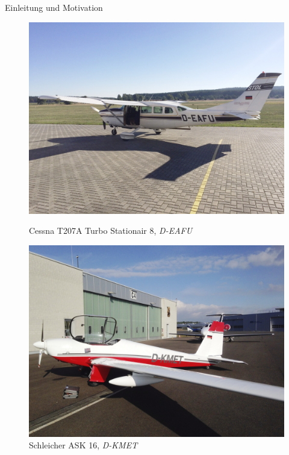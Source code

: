 \documentclass[ucs,9pt]{beamer}
\begin{document}
\begin{frame}{Einleitung und Motivation}
	\begin{figure}
		\begin{minipage}{0.45\textwidth}
			\includegraphics[width=\textwidth]{./docmedia/cessna.jpg}
			\caption{Cessna T207A Turbo Stationair 8, \textit{D-EAFU}}
		\end{minipage}
		\begin{minipage}{0.45\textwidth}
			\includegraphics[width=\textwidth]{./docmedia/ask16.jpg}
			\caption{Schleicher ASK 16, \textit{D-KMET}}
		\end{minipage}
	\end{figure}
\end{frame}
\end{document}
